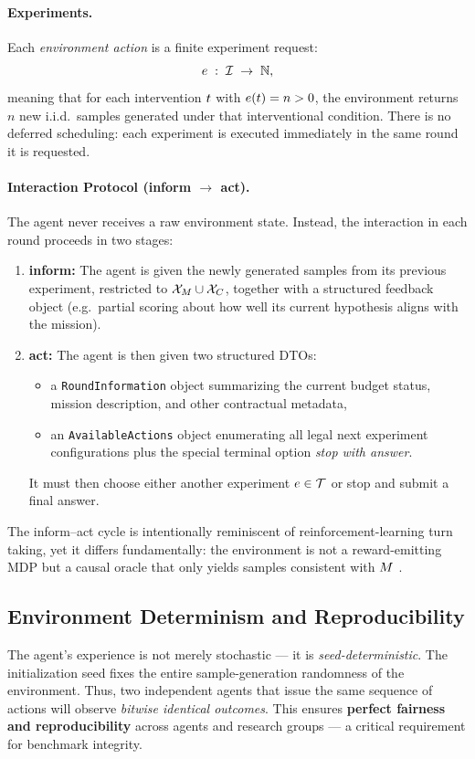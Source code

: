 \paragraph{Experiments.}
Each \emph{environment action} is a finite experiment request:
\[
    e \;:\; \interventions \;\to\; \mathbb{N},
\]
meaning that for each intervention $t$ with $e(t) = n > 0$, the environment returns $n$ new i.i.d.\ samples generated under that interventional condition. There is no deferred scheduling: each experiment is executed immediately in the same round it is requested.

\paragraph{Interaction Protocol (inform $\rightarrow$ act).}
The agent never receives a raw environment state. Instead, the interaction in each round proceeds in two stages:
\begin{enumerate}
    \item \textbf{inform:} The agent is given the newly generated samples from its previous experiment, restricted to $\mathcal{X}_M \cup \mathcal{X}_C$, together with a structured feedback object (e.g.\ partial scoring about how well its current hypothesis aligns with the mission).
    \item \textbf{act:} The agent is then given two structured DTOs:
    \begin{itemize}
        \item a \texttt{RoundInformation} object summarizing the current budget status, mission description, and other contractual metadata,
        \item an \texttt{AvailableActions} object enumerating all legal next experiment configurations plus the special terminal option \emph{stop with answer}.
    \end{itemize}
    It must then choose either another experiment $e \in \experiments$ or stop and submit a final answer.
\end{enumerate}
The inform–act cycle is intentionally reminiscent of reinforcement-learning turn taking, yet it differs fundamentally: the environment is not a reward-emitting MDP but a causal oracle that only yields samples consistent with $M$ \citep{von2019optimal,Seitzer2021CausalIDA,Mehrjou2020CausalCRA}.


\subsection{Environment Determinism and Reproducibility}
The agent’s experience is not merely stochastic — it is \emph{seed-deterministic}. The initialization seed fixes the entire sample-generation randomness of the environment. Thus, two independent agents that issue the same sequence of actions will observe \emph{bitwise identical outcomes}. This ensures \textbf{perfect fairness and reproducibility} across agents and research groups — a critical requirement for benchmark integrity.

